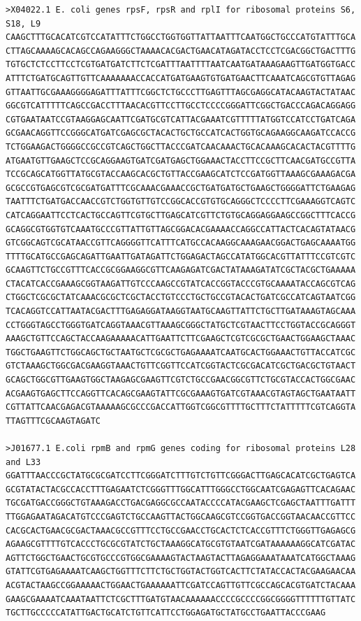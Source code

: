 \documentclass[
]{book}
\begin{document}
\begin{verbatim}
>X04022.1 E. coli genes rpsF, rpsR and rplI for ribosomal proteins S6, S18, L9
CAAGCTTTGCACATCGTCCATATTTCTGGCCTGGTGGTTATTAATTTCAATGGCTGCCCATGTATTTGCA
CTTAGCAAAAGCACAGCCAGAAGGGCTAAAACACGACTGAACATAGATACCTCCTCGACGGCTGACTTTG
TGTGCTCTCCTTCCTCGTGATGATCTTCTCGATTTAATTTTAATCAATGATAAAGAAGTTGATGGTGACC
ATTTCTGATGCAGTTGTTCAAAAAAACCACCATGATGAAGTGTGATGAACTTCAAATCAGCGTGTTAGAG
GTTAATTGCGAAAGGGGAGATTTATTTCGGCTCTGCCCTTGAGTTTAGCGAGGCATACAAGTACTATAAC
GGCGTCATTTTTCAGCCGACCTTTAACACGTTCCTTGCCTCCCCGGGATTCGGCTGACCCAGACAGGAGG
CGTGAATAATCCGTAAGGAGCAATTCGATGCGTCATTACGAAATCGTTTTTATGGTCCATCCTGATCAGA
GCGAACAGGTTCCGGGCATGATCGAGCGCTACACTGCTGCCATCACTGGTGCAGAAGGCAAGATCCACCG
TCTGGAAGACTGGGGCCGCCGTCAGCTGGCTTACCCGATCAACAAACTGCACAAAGCACACTACGTTTTG
ATGAATGTTGAAGCTCCGCAGGAAGTGATCGATGAGCTGGAAACTACCTTCCGCTTCAACGATGCCGTTA
TCCGCAGCATGGTTATGCGTACCAAGCACGCTGTTACCGAAGCATCTCCGATGGTTAAAGCGAAAGACGA
GCGCCGTGAGCGTCGCGATGATTTCGCAAACGAAACCGCTGATGATGCTGAAGCTGGGGATTCTGAAGAG
TAATTTCTGATGACCAACCGTCTGGTGTTGTCCGGCACCGTGTGCAGGGCTCCCCTTCGAAAGGTCAGTC
CATCAGGAATTCCTCACTGCCAGTTCGTGCTTGAGCATCGTTCTGTGCAGGAGGAAGCCGGCTTTCACCG
GCAGGCGTGGTGTCAAATGCCCGTTATTGTTAGCGGACACGAAAACCAGGCCATTACTCACAGTATAACG
GTCGGCAGTCGCATAACCGTTCAGGGGTTCATTTCATGCCACAAGGCAAAGAACGGACTGAGCAAAATGG
TTTTGCATGCCGAGCAGATTGAATTGATAGATTCTGGAGACTAGCCATATGGCACGTTATTTCCGTCGTC
GCAAGTTCTGCCGTTTCACCGCGGAAGGCGTTCAAGAGATCGACTATAAAGATATCGCTACGCTGAAAAA
CTACATCACCGAAAGCGGTAAGATTGTCCCAAGCCGTATCACCGGTACCCGTGCAAAATACCAGCGTCAG
CTGGCTCGCGCTATCAAACGCGCTCGCTACCTGTCCCTGCTGCCGTACACTGATCGCCATCAGTAATCGG
TCACAGGTCCATTAATACGACTTTGAGAGGATAAGGTAATGCAAGTTATTCTGCTTGATAAAGTAGCAAA
CCTGGGTAGCCTGGGTGATCAGGTAAACGTTAAAGCGGGCTATGCTCGTAACTTCCTGGTACCGCAGGGT
AAAGCTGTTCCAGCTACCAAGAAAAACATTGAATTCTTCGAAGCTCGTCGCGCTGAACTGGAAGCTAAAC
TGGCTGAAGTTCTGGCAGCTGCTAATGCTCGCGCTGAGAAAATCAATGCACTGGAAACTGTTACCATCGC
GTCTAAAGCTGGCGACGAAGGTAAACTGTTCGGTTCCATCGGTACTCGCGACATCGCTGACGCTGTAACT
GCAGCTGGCGTTGAAGTGGCTAAGAGCGAAGTTCGTCTGCCGAACGGCGTTCTGCGTACCACTGGCGAAC
ACGAAGTGAGCTTCCAGGTTCACAGCGAAGTATTCGCGAAAGTGATCGTAAACGTAGTAGCTGAATAATT
CGTTATTCAACGAGACGTAAAAAGCGCCCGACCATTGGTCGGCGTTTTGCTTTCTATTTTTCGTCAGGTA
TTAGTTTCGCAAGTAGATC

>J01677.1 E.coli rpmB and rpmG genes coding for ribosomal proteins L28 and L33
GGATTTAACCCGCTATGCGCGATCCTTCGGGATCTTTGTCTGTTCGGGACTTGAGCACATCGCTGAGTCA
GCGTATACTACGCCACCTTTGAGAATCTCGGGTTTGGCATTTGGGCCTGGCAATCGAGAGTTCACAGAAC
TGCGATGACCGGGCTGTAAAGACCTGACGAGGCGCCAATACCCCATACGAAGCTCGAGCTAATTTGATTT
TTGGAGAATAGACATGTCCCGAGTCTGCCAAGTTACTGGCAAGCGTCCGGTGACCGGTAACAACCGTTCC
CACGCACTGAACGCGACTAAACGCCGTTTCCTGCCGAACCTGCACTCTCACCGTTTCTGGGTTGAGAGCG
AGAAGCGTTTTGTCACCCTGCGCGTATCTGCTAAAGGCATGCGTGTAATCGATAAAAAAGGCATCGATAC
AGTTCTGGCTGAACTGCGTGCCCGTGGCGAAAAGTACTAAGTACTTAGAGGAAATAAATCATGGCTAAAG
GTATTCGTGAGAAAATCAAGCTGGTTTCTTCTGCTGGTACTGGTCACTTCTATACCACTACGAAGAACAA
ACGTACTAAGCCGGAAAAACTGGAACTGAAAAAATTCGATCCAGTTGTTCGCCAGCACGTGATCTACAAA
GAAGCGAAAATCAAATAATTCTCGCTTTGATGTAACAAAAAACCCCGCCCCGGCGGGGTTTTTTGTTATC
TGCTTGCCCCCATATTGACTGCATCTGTTCATTCCTGGAGATGCTATGCCTGAATTACCCGAAG
\end{verbatim}
\end{document}
